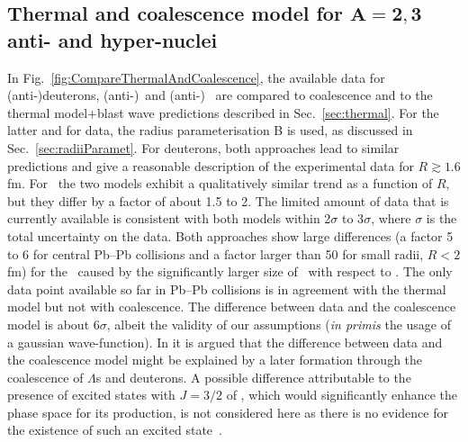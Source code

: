 \subsection{Thermal and coalescence model for $\mathbf{A = 2, 3}$ anti- and hyper-nuclei}
In Fig.~\ref{fig:CompareThermalAndCoalescence}, the available data for (anti-)deuterons, \mbox{(anti-)}\hethree\ and (anti-)\hthreelambda~\cite{Adam:2015yta} are compared to coalescence and to the thermal model+blast wave predictions described in Sec.~\ref{sec:thermal}.
For the latter and for data, the radius parameterisation B is used, as discussed in Sec.~\ref{sec:radiiParamet}. 
For deuterons, both approaches lead to similar predictions and give a reasonable description of the experimental data for $R \gtrsim 1.6$ fm. 
For \hethree~the two models exhibit a qualitatively similar trend as a function of $R$, but they differ by a factor of about 1.5 to 2. The limited amount of data that is currently available is consistent with both models within 2$\sigma$ to 3$\sigma$, where $\sigma$ is the total uncertainty on the data. 
Both approaches show large differences (a factor 5 to 6 for central Pb--Pb collisions and a factor larger than 50 for small radii, $R < 2$ fm) for the \hthreelambda\ caused by the significantly larger size of \hthreelambda\ with respect to \hethree. 
The only data point available so far in Pb--Pb collisions is in agreement with the thermal model but not with coalescence. 
The difference between data and the coalescence model is about 6$\sigma$,
albeit the validity of our assumptions (\textit{in primis} the usage of a gaussian wave-function).
%
%
In \cite{Zhang:2018euf} it is argued that the difference between data and the coalescence model might be explained by a later formation through the coalescence of $\Lambda$s and deuterons. 
A possible difference attributable to the presence of excited states with $J=3/2$ of \hthreelambda, which would significantly enhance the phase space for its production, is not considered here as there is no evidence for the existence of such an excited state~\cite{Mart:1996ay}. 

